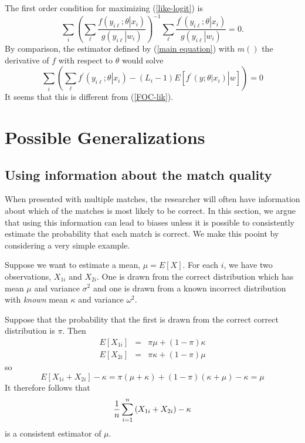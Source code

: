 \documentclass[12pt]{article}
\begin{document}
The first order condition for maximizing (\ref{like-logit}) is%
\begin{equation}
\sum_{i}\left( \sum_{\ell }^{{}}\frac{f\left( \left. y_{i\ell };\theta
\right\vert x_{i}\right) }{g\left( \left. y_{i\ell }\right\vert w_{i}\right)
}\right) ^{-1}\sum_{\ell }^{{}}\frac{f^{\prime }\left( \left. y_{i\ell
};\theta \right\vert x_{i}\right) }{g\left( \left. y_{i\ell }\right\vert
w_{i}\right) }=0.  \label{FOC-lik}
\end{equation}%
By comparison, the estimator defined by (\ref{main equation}) with $m()$ the
derivative of $f$ with respect to $\theta $ would solve%
\begin{equation}
\sum_{i}\left( \sum_{\ell }f^{\prime }\left( \left. y_{i\ell };\theta
\right\vert x_{i}\right) -\left( L_{i}-1\right) E\left[ \left. f^{\prime
}\left( \left. y;\theta \right\vert x_{i}\right) \right\vert w\right]
\right) =0
\end{equation}%
It seems that this is different from (\ref{FOC-lik}).

\section{Possible Generalizations}

\subsection{Using information about the match quality}

When presented with multiple matches, the researcher will often have
information about which of the matches is most likely to be correct. In this
section, we argue that using this information can lead to biases unless it
is possible to consistently estimate the probability that each match is
correct. We make this pooint by considering a very simple example.

Suppose we want to estimate a mean, $\mu =E\left[ X\right] $. For each $i$,
we have two observations, $X_{1i}$ and $X_{2i}$. One is drawn from the
correct distribution which has mean $\mu $ and variance $\sigma ^{2}$ and
one is drawn from a known incorrect distribution with \textsl{known} mean $%
\kappa $ and variance $\omega ^{2}$.

Suppose that the probability that the first is drawn from the correct
correct distribution is $\pi $. Then%
\begin{eqnarray*}
E\left[ X_{1i}\right] &=&\pi \mu +\left( 1-\pi \right) \kappa \\
E\left[ X_{2i}\right] &=&\pi \kappa +\left( 1-\pi \right) \mu
\end{eqnarray*}%
so
\begin{equation*}
E\left[ X_{1i}+X_{2i}\right] -\kappa =\pi \left( \mu +\kappa \right) +\left(
1-\pi \right) \left( \kappa +\mu \right) -\kappa =\mu
\end{equation*}%
It therefore follows that
\begin{equation*}
\frac{1}{n}\dsum\limits_{i=1}^{n}\left( X_{1i}+X_{2i}\right) -\kappa
\end{equation*}%
is a consistent estimator of $\mu $.
\end{document}
